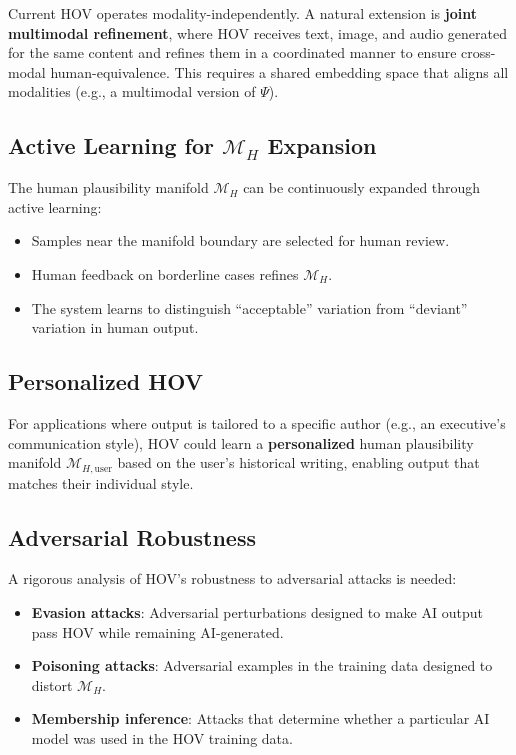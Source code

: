 \documentclass[12pt,oneside]{article}
\begin{document}
{{{{{{{{{{{Current HOV operates modality-independently. A natural extension is \textbf{joint multimodal refinement}, where HOV receives text, image, and audio generated for the same content and refines them in a coordinated manner to ensure cross-modal human-equivalence. This requires a shared embedding space that aligns all modalities (e.g., a multimodal version of $\Psi$).

\subsection{Active Learning for $\mathcal{M}_H$ Expansion}

The human plausibility manifold $\mathcal{M}_H$ can be continuously expanded through active learning:
\begin{itemize}[noitemsep]
    \item Samples near the manifold boundary are selected for human review.
    \item Human feedback on borderline cases refines $\mathcal{M}_H$.
    \item The system learns to distinguish ``acceptable'' variation from ``deviant'' variation in human output.
\end{itemize}

\subsection{Personalized HOV}

For applications where output is tailored to a specific author (e.g., an executive's communication style), HOV could learn a \textbf{personalized} human plausibility manifold $\mathcal{M}_{H, \text{user}}$ based on the user's historical writing, enabling output that matches their individual style.

\subsection{Adversarial Robustness}

A rigorous analysis of HOV's robustness to adversarial attacks is needed:
\begin{itemize}[noitemsep]
    \item \textbf{Evasion attacks}: Adversarial perturbations designed to make AI output pass HOV while remaining AI-generated.
    \item \textbf{Poisoning attacks}: Adversarial examples in the training data designed to distort $\mathcal{M}_H$.
    \item \textbf{Membership inference}: Attacks that determine whether a particular AI model was used in the HOV training data.
\end{itemize}

}}}}}}}}}}}
\end{document}
